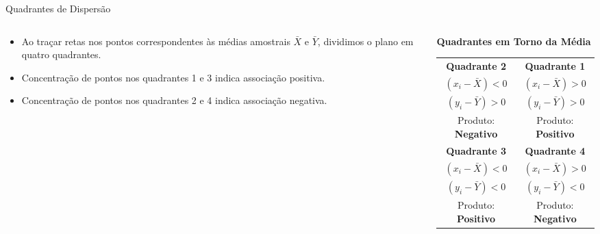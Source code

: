 \begin{frame}{Quadrantes de Dispersão}
    \begin{columns}
        \begin{column}{0.45\textwidth}
            \begin{itemize}
                \item Ao traçar retas nos pontos correspondentes às médias amostrais $\bar{X}$ e $\bar{Y}$, dividimos o plano em quatro quadrantes.
                \item Concentração de pontos nos quadrantes 1 e 3 indica associação positiva.
                \item Concentração de pontos nos quadrantes 2 e 4 indica associação negativa.
            \end{itemize}
        \end{column}
        \begin{column}{0.55\textwidth}
            \centering
            \textbf{Quadrantes em Torno da Média}
            \vspace{0.2cm}
            \small
            \begin{tabular}{c|c}
                \textbf{Quadrante 2} & \textbf{Quadrante 1} \\
                $(x_i - \bar{X}) < 0$ & $(x_i - \bar{X}) > 0$ \\
                $(y_i - \bar{Y}) > 0$ & $(y_i - \bar{Y}) > 0$ \\
                Produto: \textbf{Negativo} & Produto: \textbf{Positivo} \\
                \hline
                \textbf{Quadrante 3} & \textbf{Quadrante 4} \\
                $(x_i - \bar{X}) < 0$ & $(x_i - \bar{X}) > 0$ \\
                $(y_i - \bar{Y}) < 0$ & $(y_i - \bar{Y}) < 0$ \\
                Produto: \textbf{Positivo} & Produto: \textbf{Negativo} \\
            \end{tabular}
        \end{column}
    \end{columns}
\end{frame}

